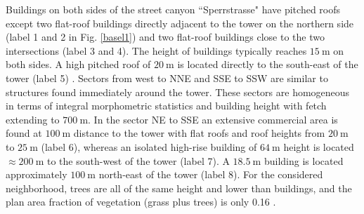 %
%
Buildings on both sides of the street canyon ``Sperrstrasse" have pitched roofs except two
flat-roof buildings directly adjacent to the tower on the northern side (label 1 and 2 in Fig. \ref{basel1}) and two flat-roof buildings close to the two intersections (label 3 and 4). The height of buildings typically reaches $15 \ \mathrm{m}$ on both sides. A high pitched roof of $20 \ \mathrm{m}$ is located directly to the south-east of the tower (label 5) \citep{Christen2009}.
Sectors from west to NNE and SSE to SSW are similar to structures found immediately around the tower.
These sectors are homogeneous in terms of integral morphometric statistics and building height with fetch extending to $700 \ \mathrm{m}$. In the sector NE to SSE an extensive commercial area is found at $100 \ \mathrm{m}$ distance to the tower with flat roofs and roof heights from $20 \ \mathrm{m}$ to $25 \ \mathrm{m}$ (label 6), whereas an isolated high-rise building of $64 \ \mathrm{m}$ height is located $\approx 200 \ \mathrm{m}$ to the south-west of the tower (label 7). 
A $18.5 \ \mathrm{m}$ building is located approximately $100 \ \mathrm{m}$ north-east of the tower (label 8).
For the considered neighborhood, trees are all of the same height and lower than buildings, and the plan area fraction of vegetation (grass plus trees) is only 0.16 \citep{Christen2004}.


